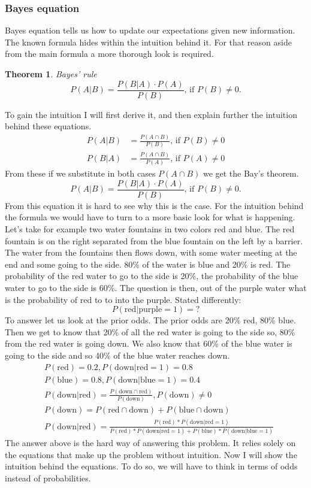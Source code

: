 \documentclass{article}
\newtheorem{theorem}{Theorem}
\begin{document}
\subsubsection{Bayes equation}
Bayes equation tells us how to update our expectations given new information.
The known formula hides within the intuition behind it. For that reason aside 
from the main formula a more thorough look is required.
\begin{theorem}
\label{thm:bayes-equation}
Bayes' rule
\[
    P(A | B) = \frac{P(B | A) \cdot P(A)}{P(B)} \text{, if $P(B) \neq  0$}
.\] 
\end{theorem}
To gain the intuition I will first derive it, and then explain further the 
intuition behind these equations. 
\begin{align*}
    P(A | B) &= \frac{P(A \cap B)}{P(B)} \text{, if $P(B) \neq  0$} \\
    P(B | A) &= \frac{P(A \cap B)}{P(A)} \text{, if $P(A) \neq  0$}
\end{align*}
From these if we substitute in both cases $P(A \cap B)$ we get the Bay's theorem.
\[
    P(A | B) = \frac{P(B | A) \cdot P(A)}{P(B)} \text{, if $P(B) \neq  0$}
.\]
From this equation it is hard to see why this is the case. For the intuition
behind the formula we would have to turn to a more basic look for what is 
happening. Let's take for example two water fountains in two colors red and blue.
The red fountain is on the right separated from the blue fountain on the left by 
a barrier. The water from the fountains then flows down, with some water meeting 
at the end and some going to the side. 80\% of the water is blue and 20\% is red.
The probability of the red water to go to the side is 20\%, the probability of the 
blue water to go to the side is 60\%. The question is then, out of the purple water
what is the probability of red to to into the purple. Stated differently: 
\[P(\text{red} | \text{purple} = 1) = ? \]
To answer let us look at the prior odds. The prior odds are 20\% red, 80\% blue. 
Then we get to know that 20\% of all the red water is going to the side so, 80\% 
from the red water is going down. We also know that 60\% of the blue water is 
going to the side and so 40\% of the blue water reaches down. 
\begin{align}
    &P(\text{red}) = 0.2,  P(\text{down} | \text{red}=1) = 0.8 \\
    &P(\text{blue}) = 0.8,  P(\text{down} | \text{blue}=1) = 0.4 \\
    &P(\text{down} | \text{red}) = \frac{P(\text{down} \cap \text{red})}{P(\text{down})}, P(\text{down}) \neq 0 \\
    &P(\text{down}) = P(\text{red} \cap \text{down}) + P(\text{blue} \cap \text{down}) \\
    &P(\text{down} | \text{red}) = \frac{P(\text{red}) * P(\text{down} | \text{red}=1)}{P(\text{red}) * P(\text{down} | \text{red}=1) + P(\text{blue}) * P(\text{down} | \text{blue}=1)}
\end{align}
The answer above is the hard way of answering this problem. It relies solely on 
the equations that make up the problem without intuition. Now I will show the 
intuition behind the equations. To do so, we will have to think in terms of odds
instead of probabilities. 
\end{document}
